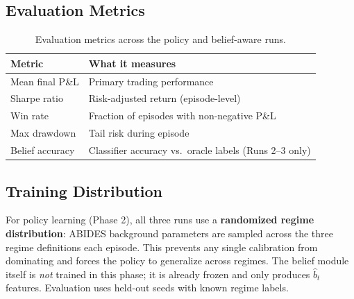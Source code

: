 \documentclass[11pt]{article}
\begin{document}
\subsection{Evaluation Metrics}

\begin{table}[h]
\centering
\begin{tabular}{ll}
\toprule
\textbf{Metric} & \textbf{What it measures} \\
\midrule
Mean final P\&L & Primary trading performance \\
Sharpe ratio & Risk-adjusted return (episode-level) \\
Win rate & Fraction of episodes with non-negative P\&L \\
Max drawdown & Tail risk during episode \\
Belief accuracy & Classifier accuracy vs.\ oracle labels (Runs 2--3 only) \\
\bottomrule
\end{tabular}
\caption{Evaluation metrics across the policy and belief-aware runs.}
\end{table}

\subsection{Training Distribution}

For policy learning (Phase 2), all three runs use a \textbf{randomized regime distribution}:
ABIDES background parameters are sampled across the three regime definitions each episode. This
prevents any single calibration from dominating and forces the policy to generalize across regimes.
The belief module itself is \emph{not} trained in this phase; it is already frozen and only produces
$\hat{b}_t$ features. Evaluation uses held-out seeds with known regime labels.
\end{document}
